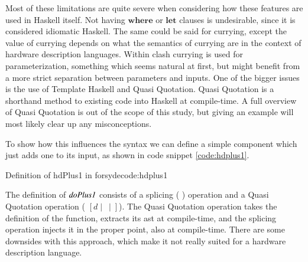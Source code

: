 Most of these limitations are quite severe when considering how these features are used in Haskell itself.
Not having \ensuremath{\mathbf{where}} or \ensuremath{\mathbf{let}} clauses is undesirable, since it is considered idiomatic Haskell. 
The same could be said for currying, except the value of currying depends on what the semantics of currying are in the context of hardware description languages. 
Within \gls{clash} currying is used for parameterization, something which seems natural at first, but might benefit from a more strict separation between parameters and inputs.
One of the bigger issues is the use of Template Haskell and Quasi Quotation.
Quasi Quotation is a shorthand method to  existing code into Haskell at compile-time. 
A full overview of Quasi Quotation is out of the scope of this study, but giving an example will most likely clear up any misconceptions.

To show how this influences the syntax we can define a simple component which just adds one to its input, as shown in code snippet \ref{code:hdplus1}.
\begin{texexptitled}{Definition of hdPlus1 in \gls{forsyde}}{code:hdplus1}
\resethooks
\end{texexptitled}

The definition of \ensuremath{\Varid{doPlus1}} consists of a splicing ( \tif{\$()} ) operation and a Quasi Quotation operation ( $[d \mid \: \mid ]$).
The Quasi Quotation operation takes the definition of the function, extracts its \gls{ast} at compile-time, and the splicing operation injects it in the proper point, also at compile-time.
There are some downsides with this approach, which make it not really suited for a hardware description language.

